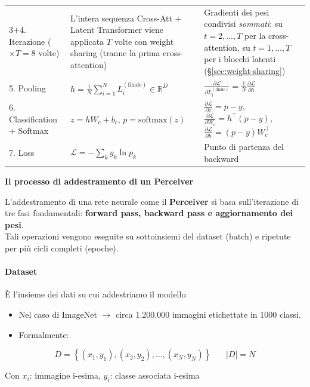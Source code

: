 \documentclass[
  11pt,
]{article}
\begin{document}
{\begin{longtable}{@{}p{2.8cm} p{5.5cm} p{5.5cm}@{}}
3$+$4. Iterazione \newline ($\times T = 8$ volte) & L'intera sequenza Cross-Att $+$ Latent Transformer viene applicata $T$ volte con weight sharing (tranne la prima cross-attention) & Gradienti dei pesi condivisi \emph{sommati}: su $t = 2, \ldots, T$ per la cross-attention, su $t = 1, \ldots, T$ per i blocchi latenti (\S\ref{sec:weight-sharing}) \\[4pt]
5. Pooling & $h = \frac{1}{N}\sum_{i=1}^{N} L_i^{(\text{finale})} \in \mathbb{R}^D$ & $\frac{\partial \mathcal{L}}{\partial L_i^{(\text{finale})}} = \frac{1}{N} \frac{\partial \mathcal{L}}{\partial h}$ \\[4pt]
6. Classification + Softmax & $z = h W_c + b_c$, $p = \text{softmax}(z)$ & $\frac{\partial \mathcal{L}}{\partial z} = p - y$, $\frac{\partial \mathcal{L}}{\partial W_c} = h^\top (p-y)$, $\frac{\partial \mathcal{L}}{\partial h} = (p-y) W_c^\top$ \\[4pt]
7. Loss & $\mathcal{L} = -\sum_k y_k \ln p_k$ & Punto di partenza del backward \\
\bottomrule
\end{longtable}
}

\textbf{Il processo di addestramento di un Perceiver}

L'addestramento di una rete neurale come il \textbf{Perceiver} si basa
sull'iterazione di tre fasi fondamentali: \textbf{forward pass, backward
pass e aggiornamento dei pesi}.\\
Tali operazioni vengono eseguite su sottoinsiemi del dataset (batch) e
ripetute per più cicli completi (epoche).

\paragraph{Dataset}


È l'insieme dei dati su cui addestriamo il modello.


\begin{itemize}
\item
  Nel caso di ImageNet \(\rightarrow\) circa 1.200.000 immagini
  etichettate in 1000 classi.
\item
  Formalmente:
\end{itemize}


\[D = \left\{ \left( x_{1},y_{1} \right),\left( x_{2},y_{2} \right),\ldots,\left( x_{N},y_{N} \right) \right\}\ \ \ \ \ \ \ \ |D| = N\]

Con \(x_{i}\): immagine i-esima, \(y_{i}\): classe associata i-esima
\end{document}
